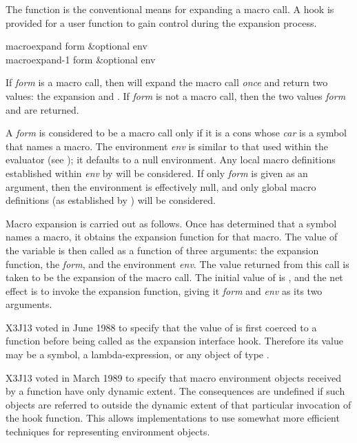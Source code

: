 The  function is the conventional means for
expanding a macro call.  A hook is provided for a user function
to gain control during the expansion process.

\begin{defun}[Function]
macroexpand form &optional env \\
macroexpand-1 form &optional env

If \emph{form} is a macro call, then  will expand the macro
call \emph{once} and return two values: the expansion and .
If \emph{form} is not a macro call, then the two values \emph{form} and {\nil} are
returned.

A \emph{form} is considered to be a macro call only if it is a cons whose
\emph{car} is a symbol that names a macro.  The environment \emph{env} is similar
to that used within the evaluator (see );
it defaults to a null environment.
Any local macro definitions established within \emph{env} by
 will be considered.  If only \emph{form} is given as an
argument, then the environment is effectively null,
and only global macro definitions
(as established by ) will be considered.

Macro expansion is carried out as follows.  Once  has
determined that a symbol names a macro, it obtains the expansion
function for that macro.  The value of the variable
 is then called as a function of three arguments:
the expansion function, the \emph{form}, and the environment \emph{env}.
The value returned from
this call is taken to be the expansion of the macro call.
The initial value of  is ,
and the net effect is to invoke the expansion function, giving
it \emph{form} and \emph{env} as its two arguments.

\begin{newer}
X3J13 voted in June 1988  to specify
that the value of  is first coerced to a
function before being called as the expansion interface hook.
Therefore its value may be a symbol, a lambda-expression, or any
object of type .
\end{newer}

\begin{newer}
X3J13 voted in March 1989 
to specify that macro environment objects received
by a  function
have only dynamic extent.  The consequences are undefined if such objects are
referred to outside the dynamic extent of that particular invocation of the hook
function.  This allows implementations to use somewhat more efficient techniques
for representing environment objects. 
\end{newer}


\end{defun}
